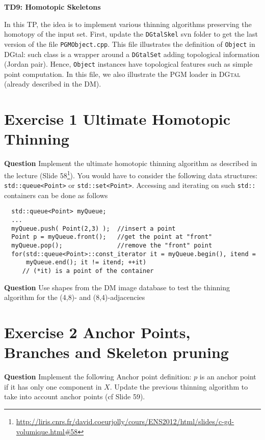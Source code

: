 \documentclass[a4paper, 11pt]{article}
\title{}
\author{}
\date{}
\begin{document}
\begin{center}
	\LARGE \textbf{TD9: Homotopic Skeletons}
\end{center}

\bigskip
\par In this TP, the idea is to implement various thinning algorithms preserving the homotopy of the input set. First, update the \texttt{DGtalSkel} svn folder to get the last version of the file \texttt{PGMObject.cpp}. This file illustrates the definition of \texttt{Object} in DGtal: such class is a wrapper around a \texttt{DGtalSet} adding topological information (Jordan pair). Hence, \texttt{Object} instances have topological features such as simple point computation. In this file, we also illustrate the PGM loader in \textsc{DGtal} (already described in the DM).

\section*{Exercise 1 \rm Ultimate Homotopic Thinning}

{\bf Question} Implement the ultimate homotopic thinning algorithm as described in the lecture (Slide 58\footnote{\url{http://liris.cnrs.fr/david.coeurjolly/cours/ENS2012/html/slides/c-gd-volumique.html\#58}}). You would have to consider the following data structures: \texttt{std::queue<Point>} or \texttt{std::set<Point>}. Accessing and iterating on such \texttt{std::} containers can be done as follows
\begin{verbatim}
  std::queue<Point> myQueue;
  ...
  myQueue.push( Point(2,3) );  //insert a point
  Point p = myQueue.front();   //get the point at "front"
  myQueue.pop();               //remove the "front" point
  for(std::queue<Point>::const_iterator it = myQueue.begin(), itend =
      myQueue.end(); it != itend; ++it)
     // (*it) is a point of the container
\end{verbatim}

{\bf Question} Use shapes from the DM image database to test the thinning algorithm for the (4,8)- and (8,4)-adjacencies

\section*{Exercise 2 \rm Anchor Points, Branches and Skeleton pruning}

{\bf Question} Implement the following Anchor point definition: $p$ is an anchor point if it has only one component in $X$. Update the previous thinning algorithm to take into account anchor points (cf Slide 59).
\end{document}

